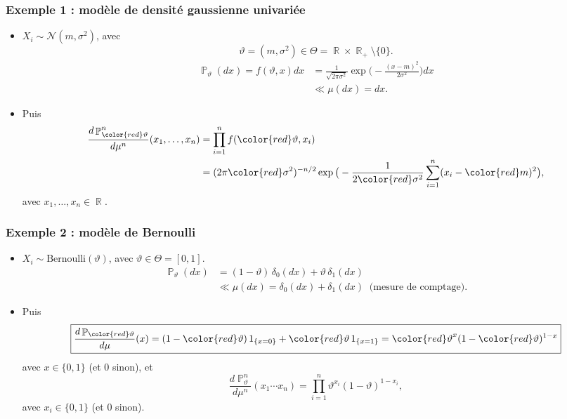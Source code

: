 ﻿\documentclass{beamer}
\DeclareMathOperator{\R}{{\mathbb R}}
\DeclareMathOperator{\PP}{{\mathbb P}}
\begin{document}
\begin{frame}
\frametitle{Exemple 1 : modèle de densité gaussienne univariée}
\begin{itemize}
\item $X_i\sim {\mathcal N}(m,\sigma^2)$,
avec
$$\vartheta = (m,\sigma^2) \in \Theta = \R\times \R_+\setminus\{0\}.$$
\begin{align*}
\PP_\vartheta(dx) = f(\vartheta,x)dx & =\frac{1}{\sqrt{2\pi \sigma^2}}\exp\Big(-\frac{(x-m)^2}{2\sigma^2}\Big)dx \\
& \ll \mu(dx)=dx.
\end{align*}
\item Puis
\begin{align*}
\frac{d\PP_{{\color{red}\vartheta}}^n}{d\mu^n}(x_1,\ldots, x_n) & = \prod_{i = 1}^n f({\color{red}\vartheta},x_i) \\
& =(2\pi {\color{red}\sigma^2})^{-n/2}\exp\big(-\frac{1}{2{\color{red}\sigma^2}}\sum_{i = 1}^n (x_i-{\color{red}m})^2\big),
\end{align*}
avec $x_1,\ldots,x_n \in \R$.
\end{itemize}
\end{frame}

\begin{frame}
\frametitle{Exemple 2 :  modèle de Bernoulli}
\begin{itemize}
\item $X_i \sim \text{Bernoulli}(\vartheta)$, avec $\vartheta \in \Theta = [0,1]$.
\begin{align*}
\PP_\vartheta(dx)& = (1-\vartheta)\, \delta_{0}(dx) + \vartheta\, \delta_1(dx) \\
& \ll \mu(dx) = \delta_0(dx)+\delta_1(dx)\;\;\text{(mesure de comptage)}.
\end{align*}
\item Puis
$$\boxed{\frac{d\PP_{\color{red}\vartheta}}{d\mu}(x) = (1-{\color{red}\vartheta})\,1_{\{x=0\}}+{\color{red}\vartheta}\,1_{\{x=1\}} = {\color{red}\vartheta}^x(1-{\color{red}\vartheta})^{1-x}}$$
{\color{red}avec $x\in \{0,1\}$} (et $0$ sinon), et
$$\frac{d\PP_\vartheta^n}{d\mu^n}(x_1\cdots x_n) = \prod_{i = 1}^n \vartheta^{x_i}(1-\vartheta)^{1-x_i},$$
{\color{red}avec $x_i \in \{0,1\}$} (et $0$ sinon).
\end{itemize}
\end{frame}
\end{document}
